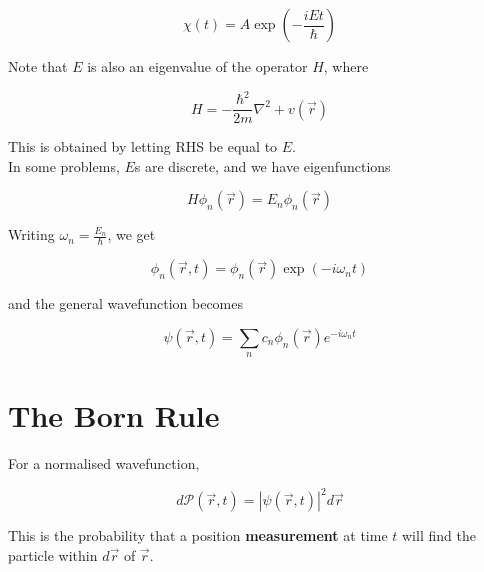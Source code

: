 \documentclass[12pt]{article}
\begin{document}
$$\chi(t) = A\exp\left(-\frac{iEt}{\hbar}\right)$$

Note that $E$ is also an eigenvalue of the operator $H$, where

\begin{equation}
    H = -\frac{\hbar^2}{2m}\nabla^2 + v(\vec r)
\end{equation}

This is obtained by letting RHS be equal to $E$. \\

In some problems, $E$s are discrete, and we have eigenfunctions

\begin{equation}
    H\phi_n(\vec r) = E_n\phi_n(\vec r)
\end{equation}

Writing $\omega_n = \frac{E_n}{\hbar}$, we get

\begin{equation}
    \phi_n(\vec r,t) = \phi_n(\vec r) \exp(-i\omega_nt)
\end{equation}

and the general wavefunction becomes

\begin{equation}
    \psi(\vec r,t) = \sum_n c_n\phi_n(\vec r)e^{-i\omega_nt}
\end{equation}

\section{The Born Rule}

For a normalised wavefunction,

\begin{equation}
    d\mathcal P(\vec r,t) = |\psi(\vec r,t)|^2d\vec r
\end{equation}

This is the probability that a position \textbf{measurement} at time $t$ will find the particle within $d\vec r$ of $\vec r$.
\end{document}
